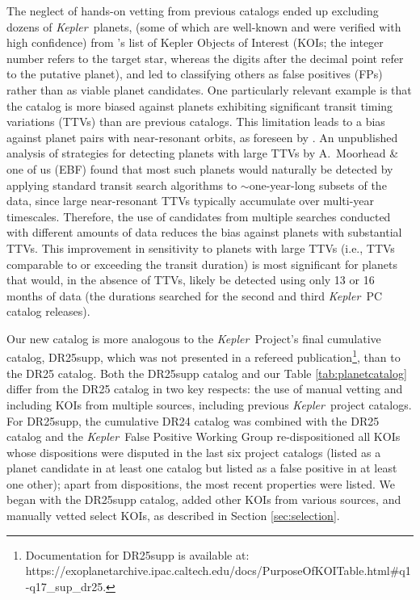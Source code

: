 \documentclass{aastex62}
\newcommand{\ik}{{\it Kepler~}}
\begin{document}
The neglect of hands-on vetting from previous catalogs ended up excluding dozens of \ik planets, (some of which are well-known and were verified with high confidence) from \cite{Thompson:2018}'s list of Kepler Objects of Interest (KOIs; the integer number refers to the target star, whereas the digits after the decimal point refer to the putative planet), and led to classifying others as false positives (FPs) rather than as viable planet candidates. One particularly relevant example is that the \cite{Thompson:2018} catalog is more biased against planets exhibiting significant transit timing variations (TTVs) than are previous catalogs.  This limitation leads to a bias against planet pairs with near-resonant orbits, {as foreseen by \cite{Garcia:2011}. An unpublished analysis of strategies for detecting planets with large TTVs by A.~Moorhead \& one of us (EBF) found that most such planets would naturally be detected by applying standard transit search algorithms to $\sim$one-year-long subsets of the data, since large near-resonant TTVs typically accumulate over multi-year timescales.  Therefore,} the use of candidates from multiple searches conducted with different amounts of data reduces the bias against planets with substantial TTVs.  {This improvement in sensitivity to planets with large TTVs (i.e., TTVs comparable to or exceeding the transit duration) is most significant for planets that would, in the absence of TTVs, likely be detected using only 13 or 16 months of data (the durations searched for the second and third \ik PC catalog releases).  }%

Our new catalog is more analogous to the \ik Project's final cumulative catalog, DR25supp, which was not presented in a refereed publication\footnote{Documentation for DR25supp is available at: https://exoplanetarchive.ipac.caltech.edu/docs/PurposeOfKOITable.html\#q1-q17\_sup\_dr25.}, than to the DR25 catalog. Both the DR25supp catalog and our Table \ref{tab:planetcatalog}  differ from the DR25 catalog in two key respects: the use of manual vetting and including KOIs from multiple sources, including previous \ik project catalogs. For DR25supp, the cumulative DR24 catalog was combined with the DR25 catalog and the \ik False Positive Working Group re-dispositioned all KOIs whose dispositions were disputed  in the last six project catalogs (listed as a planet candidate in at least one catalog but listed as a false positive in at least one other); apart from dispositions, the most recent properties were listed. We began with the  DR25supp catalog, added other KOIs from various sources, and manually vetted select KOIs, as described in Section \ref{sec:selection}. 
\end{document}
